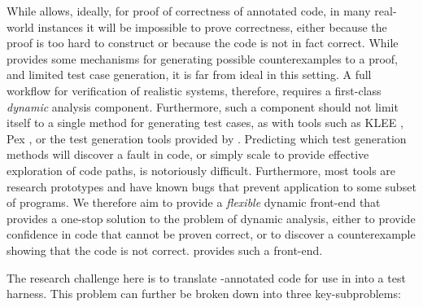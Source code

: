 While \framac allows, ideally, for proof of correctness of annotated code, in many real-world instances it will be impossible to prove correctness, either because the proof is too hard to construct or because the code is not in fact correct.  While \framac provides some mechanisms for generating possible counterexamples to a proof, and limited test case generation, it is far from ideal in this setting.  A full workflow for verification of realistic systems, therefore, requires a first-class \emph{dynamic} analysis component.  Furthermore, such a component should not limit itself to a single method for generating test cases, as with tools such as KLEE \cite{KLEE}, Pex \cite{Pex}, or the test generation tools provided by \framac \cite{PathCrawler}.  Predicting which test generation methods will discover a fault in code, or simply scale to provide effective exploration of code paths, is notoriously difficult.  Furthermore, most tools are research prototypes and have known bugs that prevent application to some subset of programs.  We therefore aim to provide a \emph{flexible} dynamic front-end that provides a one-stop solution to the problem of dynamic analysis, either to provide confidence in code that cannot be proven correct, or to discover a counterexample showing that the code is not correct.  \deepstate \cite{DeepState} provides such a front-end.

The research challenge here is to translate \acsl-annotated code for use in \framac into a \deepstate test harness.  This problem can further be broken down into three key-subproblems:

